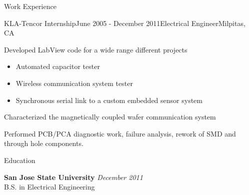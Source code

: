 \documentclass{resume} %
\begin{document}
\begin{rSection}{Work Experience}
\begin{rSubsection}{KLA-Tencor Internship}{June 2005 - December 2011}{Electrical Engineer}{Milpitas, CA}
\item Developed LabView code for a wide range different projects
\begin{itemize}
\itemsep -0.5em \vspace{-0.5em}
\renewcommand{\labelitemi}{-}
\item Automated capacitor tester
\item Wireless communication system tester
\item Synchronous serial link to a custom embedded sensor system
\end{itemize}
\item Characterized the magnetically coupled wafer communication system
\item Performed PCB/PCA diagnostic work, failure analysis, rework of SMD and through hole components.
\end{rSubsection}

\end{rSection}


\begin{rSection}{Education}

{\bf San Jose State University} \hfill {\em December 2011} \\ 
B.S. in Electrical Engineering \\

\end{rSection}





\end{document}

